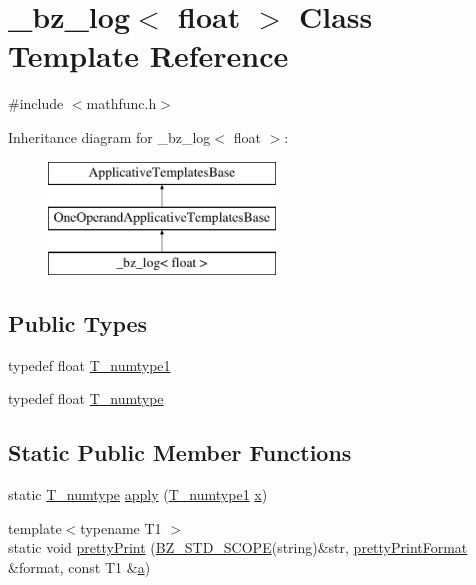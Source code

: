 \hypertarget{class__bz__log_3_01float_01_4}{}\section{\+\_\+bz\+\_\+log$<$ float $>$ Class Template Reference}
\label{class__bz__log_3_01float_01_4}


{\ttfamily \#include $<$mathfunc.\+h$>$}

Inheritance diagram for \+\_\+bz\+\_\+log$<$ float $>$\+:\begin{figure}[H]
\begin{center}
\leavevmode
\includegraphics[height=3.000000cm]{class__bz__log_3_01float_01_4}
\end{center}
\end{figure}
\subsection*{Public Types}
\begin{DoxyCompactItemize}
\item 
typedef float \hyperlink{class__bz__log_3_01float_01_4_af53174b104004150e5ef563020f61845}{T\+\_\+numtype1}
\item 
typedef float \hyperlink{class__bz__log_3_01float_01_4_a7d4a7a42acac2792194117f6e48ea2a9}{T\+\_\+numtype}
\end{DoxyCompactItemize}
\subsection*{Static Public Member Functions}
\begin{DoxyCompactItemize}
\item 
static \hyperlink{class__bz__log_3_01float_01_4_a7d4a7a42acac2792194117f6e48ea2a9}{T\+\_\+numtype} \hyperlink{class__bz__log_3_01float_01_4_a68fe6861899e42c814830738c884925b}{apply} (\hyperlink{class__bz__log_3_01float_01_4_af53174b104004150e5ef563020f61845}{T\+\_\+numtype1} \hyperlink{vecnorm1_8cc_ac73eed9e41ec09d58f112f06c2d6cb63}{x})
\item 
{\footnotesize template$<$typename T1 $>$ }\\static void \hyperlink{class__bz__log_3_01float_01_4_a0cdfd85a31426bd988e0093238d1c784}{pretty\+Print} (\hyperlink{numinquire_8h_a2b24ffc3b4ef9803956bc7715c6c7b83}{B\+Z\+\_\+\+S\+T\+D\+\_\+\+S\+C\+O\+P\+E}(string)\&str, \hyperlink{classprettyPrintFormat}{pretty\+Print\+Format} \&format, const T1 \&\hyperlink{gen__mat5files_8m_aae328bf20413f220e38aec4d95bfd6da}{a})
\end{DoxyCompactItemize}


